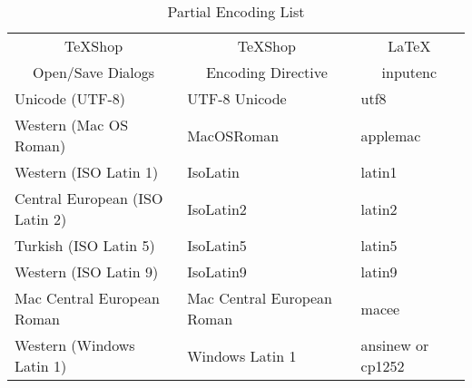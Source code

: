 \documentclass[letterpaper,11pt]{article}
\newcommand{\TS}{\textsf{\TeX Shop}}
\begin{document}
\begin{table}[H]
\centering
\begin{tabular}{lll}
\multicolumn{1}{c}{\TS} & \multicolumn{1}{c}{\TS} & \multicolumn{1}{c}{\LaTeX} \\
\multicolumn{1}{c}{Open/Save Dialogs} & \multicolumn{1}{c}{Encoding Directive} & \multicolumn{1}{c}{inputenc} \\
\cmidrule[0.5pt](lr){1-1} \cmidrule[0.5pt](lr){2-2} \cmidrule[0.5pt](lr){3-3}
Unicode (UTF-8) & UTF-8 Unicode & utf8 \\
Western (Mac OS Roman) & MacOSRoman & applemac \\
Western (ISO Latin 1) & IsoLatin & latin1 \\
Central European (ISO Latin 2) & IsoLatin2 & latin2 \\
Turkish (ISO Latin 5) & IsoLatin5 & latin5 \\
Western (ISO Latin 9) & IsoLatin9 & latin9 \\
Mac Central European Roman & Mac Central European Roman & macee \\
Western (Windows Latin 1) & Windows Latin 1 & ansinew or cp1252\\
\end{tabular}
\caption{Partial Encoding List}\label{tbl:enclist}
\end{table}
\end{document}

